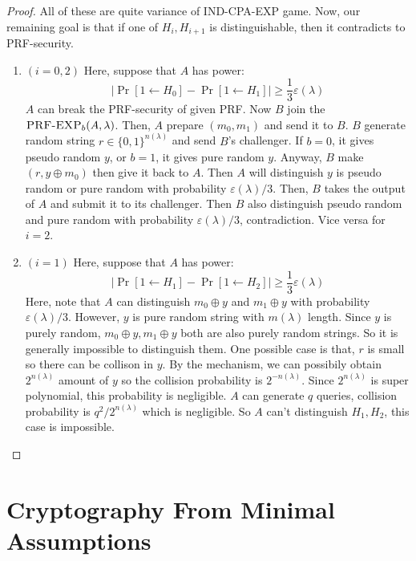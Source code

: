 \documentclass[12pt, a4paper, openany, twoside]{book}
\theoremstyle{definition}
\theoremstyle{remark}
\theoremstyle{plain}
\numberwithin{equation}{section}
\begin{document}
\begin{proof}
All of these are quite variance of \textsc{IND-CPA-EXP} game. Now, our remaining goal is that 
if one of $H_i, H_{i+1}$ is distinguishable, then it contradicts to \textsc{PRF}-security. 

\begin{enumerate}
    \item $(i = 0,2)$ Here, suppose that $A$ has power:
    \[\bigg| \Pr[1 \gets H_0] - \Pr[1 \gets H_1] \bigg| \geq \frac{1}{3}\varepsilon(\lambda)\]$A$ can break the \textsc{PRF}-security of given PRF. 
    Now $B$ join the $\textsc{PRF-EXP}_b(A, \lambda)$. Then, $A$ prepare $(m_0, m_1)$ and send it to $B$. 
    $B$ generate random string $r \in \{0,1\}^{n(\lambda)}$ and send $B$'s challenger. If $b = 0$, it gives pseudo random $y$, or $b = 1$, it gives pure random $y$. 
    Anyway, $B$ make $(r, y \oplus m_0)$ then give it back to $A$. Then $A$ will distinguish $y$ is pseudo random or pure random with probability $\varepsilon(\lambda)/3$. 
    Then, $B$ takes the output of $A$ and submit it to its challenger. Then $B$ also distinguish pseudo random and pure random with probability $\varepsilon(\lambda)/3$, contradiction. 
    Vice versa for $i = 2$.
    \item $(i = 1)$ Here, suppose that $A$ has power: 
    \[\bigg| \Pr[1 \gets H_1] - \Pr[1 \gets H_2] \bigg| \geq \frac{1}{3}\varepsilon(\lambda)\]
    Here, note that $A$ can distinguish $m_0 \oplus y$ and $m_1 \oplus y$ with probability $\varepsilon(\lambda)/3$. 
    However, $y$ is pure random string with $m(\lambda)$ length. Since $y$ is purely random, 
    $m_0 \oplus y, m_1 \oplus y$ both are also purely random strings. So it is generally impossible to distinguish them. 
    One possible case is that, $r$ is small so there can be collison in $y$. By the mechanism, 
    we can possibily obtain $2^{n(\lambda)}$ amount of $y$ so the collision probability is $2^{-n(\lambda)}$. Since $2^{n(\lambda)}$ is super polynomial, 
    this probability is negligible. $A$ can generate $q$ queries, collision probability is $q^2/2^{n(\lambda)}$ which is negligible. So $A$ can't distinguish $H_1, H_2$, this case is impossible. 
\end{enumerate}

\end{proof}

\chapter{Cryptography From Minimal Assumptions}
\end{document}
